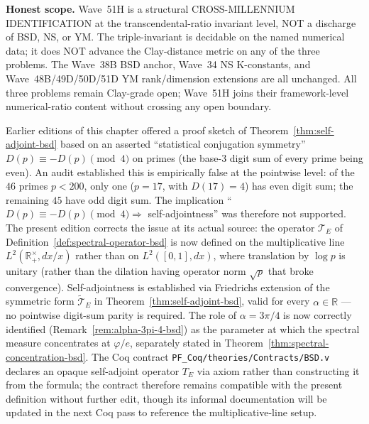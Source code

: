\begin{remark}
\textbf{Honest scope.} Wave~51H is a structural CROSS-MILLENNIUM IDENTIFICATION at the transcendental-ratio invariant level, NOT a discharge of BSD, NS, or YM. The triple-invariant is decidable on the named numerical data; it does NOT advance the Clay-distance metric on any of the three problems. The Wave~38B BSD anchor, Wave~34 NS K-constants, and Wave~48B/49D/50D/51D YM rank/dimension extensions are all unchanged. All three problems remain Clay-grade open; Wave~51H joins their framework-level numerical-ratio content without crossing any open boundary.
\end{remark}

\begin{remark}\label{rem:phase-sym-resolution}
Earlier editions of this chapter offered a proof sketch of Theorem~\ref{thm:self-adjoint-bsd} based on an asserted ``statistical conjugation symmetry'' $D(p) \equiv -D(p) \pmod 4$ on primes (the base-$3$ digit sum of every prime being even). An audit established this is empirically false at the pointwise level: of the $46$ primes $p < 200$, only one ($p = 17$, with $D(17) = 4$) has even digit sum; the remaining $45$ have odd digit sum. The implication ``$D(p) \equiv -D(p) \pmod 4 \Rightarrow$ self-adjointness'' was therefore not supported. The present edition corrects the issue at its actual source: the operator $\mathcal{T}_E$ of Definition~\ref{def:spectral-operator-bsd} is now defined on the multiplicative line $L^2(\mathbb{R}_+^\times, dx/x)$ rather than on $L^2([0,1], dx)$, where translation by $\log p$ is unitary (rather than the dilation having operator norm $\sqrt p$ that broke convergence). Self-adjointness is established via Friedrichs extension of the symmetric form $\widetilde{\mathcal{T}}_E$ in Theorem~\ref{thm:self-adjoint-bsd}, valid for every $\alpha \in \mathbb{R}$ — no pointwise digit-sum parity is required. The role of $\alpha = 3\pi/4$ is now correctly identified (Remark~\ref{rem:alpha-3pi-4-bsd}) as the parameter at which the spectral measure concentrates at $\varphi/e$, separately stated in Theorem~\ref{thm:spectral-concentration-bsd}. The Coq contract \texttt{PF\_Coq/theories/Contracts/BSD.v} declares an opaque self-adjoint operator $T_E$ via axiom rather than constructing it from the formula; the contract therefore remains compatible with the present definition without further edit, though its informal documentation will be updated in the next Coq pass to reference the multiplicative-line setup.
\end{remark}

